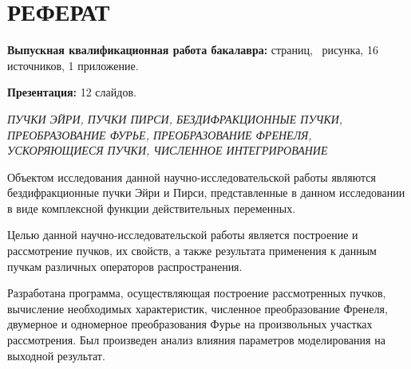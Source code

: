     \section*{РЕФЕРАТ}
    {
    \textbf{Выпускная квалификационная работа бакалавра:}
    \pageref{LastPage} страниц,
    \totalfigures\ рисунка,
    16 источников,
    1 приложение.

    \textbf{Презентация:} 12 слайдов.

    \textit{ПУЧКИ ЭЙРИ, ПУЧКИ ПИРСИ, БЕЗДИФРАКЦИОННЫЕ ПУЧКИ, \\ ПРЕОБРАЗОВАНИЕ ФУРЬЕ, ПРЕОБРАЗОВАНИЕ ФРЕНЕЛЯ, УСКОРЯЮЩИЕСЯ ПУЧКИ, ЧИСЛЕННОЕ
    ИНТЕГРИРОВАНИЕ}

    Объектом исследования данной научно-исследовательской работы
    являются бездифракционные пучки Эйри и Пирси, представленные в данном
    исследовании в виде комплексной функции действительных переменных.

    Целью данной научно-исследовательской работы является построение и
    рассмотрение пучков, их свойств, а также результата применения к данным пучкам различных операторов распространения.

    Разработана программа, осуществляющая построение
    рассмотренных пучков, вычисление необходимых характеристик, численное
    преобразование Френеля, двумерное и одномерное преобразования Фурье на произвольных участках рассмотрения. Был
    произведен анализ влияния параметров моделирования на выходной результат.


    }
    \newpage

    \newpage
    \tableofcontents
    \newpage


